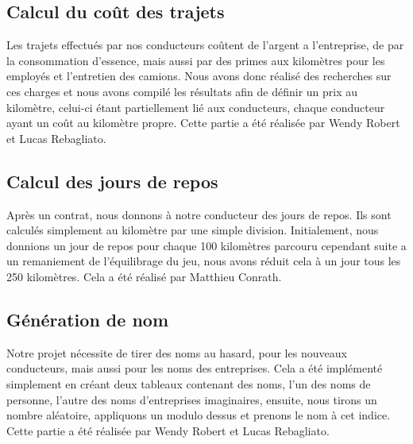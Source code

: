 \documentclass[a4paper, 12pt]{article}
\begin{document}
        
  \subsection{Calcul du coût des trajets}
        Les trajets effectués par nos conducteurs coûtent de l'argent a l'entreprise, de par la consommation d'essence, mais aussi par des primes aux kilomètres pour les employés et l'entretien des camions.
        Nous avons donc réalisé des recherches sur ces charges et nous avons compilé les résultats afin de définir un prix au kilomètre, celui-ci étant partiellement lié aux conducteurs, chaque conducteur ayant un coût au kilomètre propre.
        Cette partie a été réalisée par Wendy Robert et Lucas Rebagliato.
    \subsection{Calcul des jours de repos}
        Après un contrat, nous donnons à notre conducteur des jours de repos.
        Ils sont calculés simplement au kilomètre par une simple division.
        Initialement, nous donnions un jour de repos pour chaque 100 kilomètres parcouru cependant suite a un remaniement de l'équilibrage du jeu, nous avons réduit cela à un jour tous les 250 kilomètres.
        Cela a été réalisé par Matthieu Conrath.
    \subsection{Génération de nom}
        Notre projet nécessite de tirer des noms au hasard, pour les nouveaux conducteurs, mais aussi pour les noms des entreprises.
        Cela a été implémenté simplement en créant deux tableaux contenant des noms, l'un des noms de personne, l'autre des noms d'entreprises imaginaires, ensuite, nous tirons un nombre aléatoire, appliquons un modulo dessus et prenons le nom à cet indice.
        Cette partie a été réalisée par Wendy Robert et Lucas Rebagliato.
    
\end{document}
